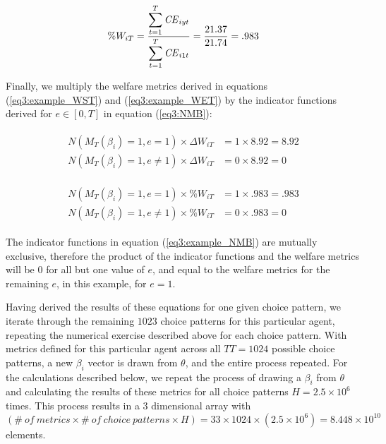 \documentclass[../main.tex]{subfiles}
\begin{document}
\begin{equation}
	\label{eq3:example_WET}
	\%W_{iT} = \frac{\displaystyle\sum_{t=1}^{T} {\mathit{CE}}_{iyt} }{\displaystyle\sum_{t=1}^{T} {\mathit{CE}}_{i1t}} = \frac{21.37}{21.74} = .983
\end{equation}

\noindent Finally, we multiply the welfare metrics derived in equations (\ref{eq3:example_WST}) and (\ref{eq3:example_WET}) by the indicator functions derived for $e \in [0,T]$ in equation (\ref{eq3:NMB}):

\begin{align}
	\label{eq3:example_NMBWST}
	\begin{split}
		N( M_T(\beta_i) = 1, e = 1 )  \times \Delta W_{iT} &= 1 \times 8.92 = 8.92\\
		N( M_T(\beta_i) = 1, e \neq 1 )  \times \Delta W_{iT} &= 0 \times 8.92 = 0
	\end{split}
\end{align}

\begin{align}
	\label{eq3:example_NMBWET}
	\begin{split}
		N( M_T(\beta_i) = 1, e = 1 )  \times \%W_{iT} &= 1 \times .983 = .983\\
		N( M_T(\beta_i) = 1, e \neq 1 )  \times \%W_{iT} &= 0 \times .983 = 0
	\end{split}
\end{align}

\noindent The indicator functions in equation (\ref{eq3:example_NMB}) are mutually exclusive, therefore the product of the indicator functions and the welfare metrics will be $0$ for all but one value of $e$, and equal to the welfare metrics for the remaining $e$, in this example, for $e = 1$.

Having derived the results of these equations for one given choice pattern, we iterate through the remaining $1023$ choice patterns for this particular agent, repeating the numerical exercise described above for each choice pattern.
With metrics defined for this particular agent across all $TT = 1024$ possible choice patterns, a new $\beta_i$ vector is drawn from $\theta$, and the entire process repeated.
For the calculations described below, we repeat the process of drawing a $\beta_i$ from $\theta$ and calculating the results of these metrics for all choice patterns $H = 2.5 \times 10^6$ times.{\footnotemark}
This process results in a $3$ dimensional array with $(\mathit{\#\ of\ metrics} \times \mathit{\#\ of\ choice\ patterns} \times H) = 33 \times 1024 \times (2.5 \times 10^6) = 8.448 \times 10^{10}$ elements.
\end{document}
